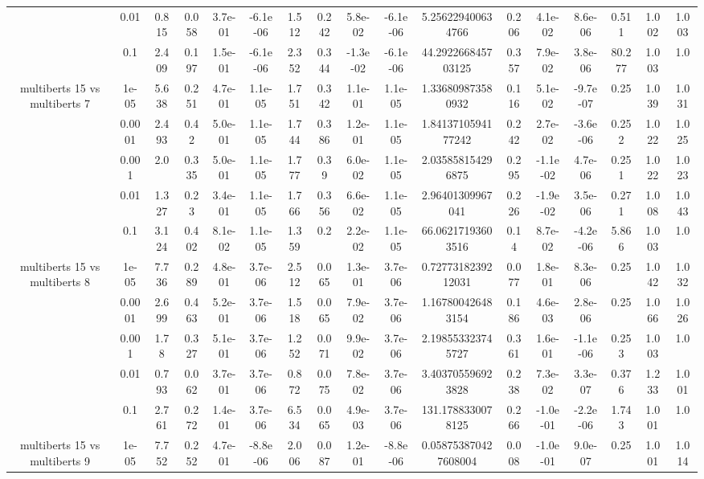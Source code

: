 \begin{tabular}{|c|c|c|c|c|c|c|c|c|c|c|c|c|c|c|c|c|}
 & 0.01 & 0.815 & 0.058 & 3.7e-01 & -6.1e-06 & 1.512 & 0.242 & 5.8e-02 & -6.1e-06 & 5.256229400634766 & 0.206 & 4.1e-02 & 8.6e-06 & 0.511 & 1.002 & 1.003 \\
 & 0.1 & 2.409 & 0.197 & 1.5e-01 & -6.1e-06 & 2.352 & 0.344 & -1.3e-02 & -6.1e-06 & 44.292266845703125 & 0.357 & 7.9e-02 & 3.8e-06 & 80.277 & 1.003 & 1.0 \\
\hline
\multirow{5}{*}{multiberts 15 vs multiberts 7} & 1e-05 & 5.638 & 0.251 & 4.7e-01 & 1.1e-05 & 1.751 & 0.342 & 1.1e-01 & 1.1e-05 & 1.336809873580932 & 0.116 & 5.1e-02 & -9.7e-07 & 0.25 & 1.039 & 1.031 \\
 & 0.0001 & 2.493 & 0.42 & 5.0e-01 & 1.1e-05 & 1.744 & 0.386 & 1.2e-01 & 1.1e-05 & 1.8413710594177242 & 0.242 & 2.7e-02 & -3.6e-06 & 0.252 & 1.022 & 1.025 \\
 & 0.001 & 2.0 & 0.335 & 5.0e-01 & 1.1e-05 & 1.777 & 0.39 & 6.0e-02 & 1.1e-05 & 2.035858154296875 & 0.295 & -1.1e-02 & 4.7e-06 & 0.251 & 1.022 & 1.023 \\
 & 0.01 & 1.327 & 0.23 & 3.4e-01 & 1.1e-05 & 1.766 & 0.356 & 6.6e-02 & 1.1e-05 & 2.96401309967041 & 0.226 & -1.9e-02 & 3.5e-06 & 0.271 & 1.008 & 1.043 \\
 & 0.1 & 3.124 & 0.402 & 8.1e-02 & 1.1e-05 & 1.359 & 0.2 & 2.2e-02 & 1.1e-05 & 66.06217193603516 & 0.14 & 8.7e-02 & -4.2e-06 & 5.866 & 1.003 & 1.0 \\
\hline
\multirow{5}{*}{multiberts 15 vs multiberts 8} & 1e-05 & 7.736 & 0.289 & 4.8e-01 & 3.7e-06 & 2.512 & 0.065 & 1.3e-01 & 3.7e-06 & 0.7277318239212031 & 0.077 & 1.8e-01 & 8.3e-06 & 0.25 & 1.042 & 1.032 \\
 & 0.0001 & 2.699 & 0.463 & 5.2e-01 & 3.7e-06 & 1.518 & 0.065 & 7.9e-02 & 3.7e-06 & 1.167800426483154 & 0.186 & 4.6e-03 & 2.8e-06 & 0.25 & 1.066 & 1.026 \\
 & 0.001 & 1.78 & 0.327 & 5.1e-01 & 3.7e-06 & 1.252 & 0.071 & 9.9e-02 & 3.7e-06 & 2.198553323745727 & 0.361 & 1.6e-01 & -1.1e-06 & 0.253 & 1.003 & 1.0 \\
 & 0.01 & 0.793 & 0.062 & 3.7e-01 & 3.7e-06 & 0.872 & 0.075 & 7.8e-02 & 3.7e-06 & 3.403705596923828 & 0.238 & 7.3e-02 & 3.3e-07 & 0.376 & 1.233 & 1.001 \\
 & 0.1 & 2.761 & 0.272 & 1.4e-01 & 3.7e-06 & 6.534 & 0.065 & 4.9e-03 & 3.7e-06 & 131.1788330078125 & 0.266 & -1.0e-01 & -2.2e-06 & 1.743 & 1.001 & 1.0 \\
\hline
\multirow{5}{*}{multiberts 15 vs multiberts 9} & 1e-05 & 7.752 & 0.252 & 4.7e-01 & -8.8e-06 & 2.006 & 0.087 & 1.2e-01 & -8.8e-06 & 0.058753870427608004 & 0.008 & -1.0e-01 & 9.0e-07 & 0.25 & 1.001 & 1.014 \\

\end{tabular}

